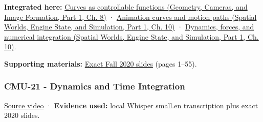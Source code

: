 \textbf{Integrated here:} \href{../03-Geometry-Cameras-and-Image-Formation-P01/main.pdf\#nameddest=03-visual-computing-i-ch001-curves-as-controllable-functions}{Curves as controllable functions (Geometry, Cameras, and Image Formation, Part 1, Ch. 8)} · \href{../05-Spatial-Worlds-Engine-State-and-Simulation-P01/main.pdf\#nameddest=04-visual-computing-ii-ch029-animation-curves-and-motion-paths}{Animation curves and motion paths (Spatial Worlds, Engine State, and Simulation, Part 1, Ch. 10)} · \href{../05-Spatial-Worlds-Engine-State-and-Simulation-P01/main.pdf\#nameddest=04-visual-computing-ii-ch029-dynamics-forces-and-numerical-integration}{Dynamics, forces, and numerical integration (Spatial Worlds, Engine State, and Simulation, Part 1, Ch. 10)}.

\textbf{Supporting materials:} \href{https://15462.courses.cs.cmu.edu/fall2020content/lectures/20_introanimation/20_introanimation_slides.pdf}{Exact Fall 2020 slides} (pages 1--55).

\subsubsection{CMU-21 - Dynamics and Time Integration}\label{04-visual-computing-ii-ch036-cmu-21---dynamics-and-time-integration}

\hypertarget{04-visual-computing-ii-ch036-cmu-21---dynamics-and-time-integration}{}

\href{https://www.youtube.com/watch?v=Fi9xu3z97W4}{Source video} · \textbf{Evidence used:} local Whisper small.en transcription plus exact 2020 slides.

